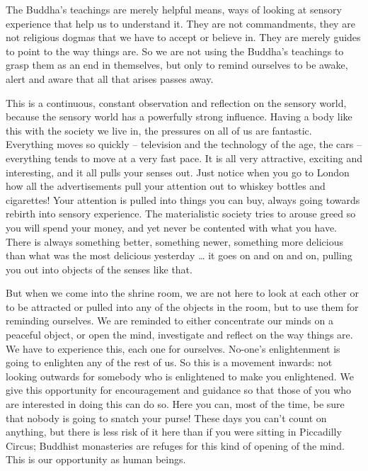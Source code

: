 The Buddha's teachings are merely helpful means, ways of looking at sensory experience that help us to understand it. They are not commandments, they are not religious dogmas that we have to accept or believe in. They are merely guides to point to the way things are. So we are not using the Buddha's teachings to grasp them as an end in themselves, but only to remind ourselves to be awake, alert and aware that all that arises passes away.

This is a continuous, constant observation and reflection on the sensory world, because the sensory world has a powerfully strong influence. Having a body like this with the society we live in, the pressures on all of us are fantastic. Everything moves so quickly -- television and the technology of the age, the cars -- everything tends to move at a very fast pace. It is all very attractive, exciting and interesting, and it all pulls your senses out. Just notice when you go to London how all the advertisements pull your attention out to whiskey bottles and cigarettes! Your attention is pulled into things you can buy, always going towards rebirth into sensory experience. The materialistic society tries to arouse greed so you will spend your money, and yet never be contented with what you have. There is always something better, something newer, something more delicious than what was the most delicious yesterday \ldots{} it goes on and on and on, pulling you out into objects of the senses like that.

But when we come into the shrine room, we are not here to look at each other or to be attracted or pulled into any of the objects in the room, but to use them for reminding ourselves. We are reminded to either concentrate our minds on a peaceful object, or open the mind, investigate and reflect on the way things are. We have to experience this, each one for ourselves. No-one's enlightenment is going to enlighten any of the rest of us. So this is a movement inwards: not looking outwards for somebody who is enlightened to make you enlightened. We give this opportunity for encouragement and guidance so that those of you who are interested in doing this can do so. Here you can, most of the time, be sure that nobody is going to snatch your purse! These days you can't count on anything, but there is less risk of it here than if you were sitting in Piccadilly Circus; Buddhist monasteries are refuges for this kind of opening of the mind. This is our opportunity as human beings.

